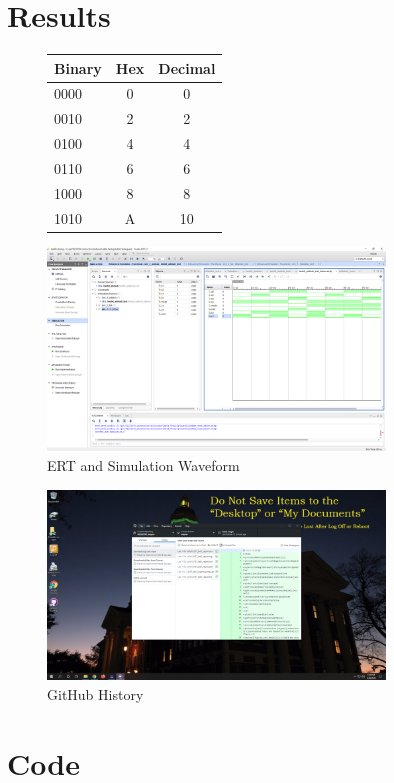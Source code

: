 \documentclass[11pt]{article}
\newcommand{\Verilog}[2][]{%
	
}
\begin{document}
\section*{Results}
\clearpage
\begin{figure}\centering
	\begin{tabular}{l|c|c}
		Binary & Hex & Decimal \\
		\midrule
		0000 & 0 & 0 \\
		0010 & 2 & 2 \\
		0100 & 4 & 4 \\
		0110 & 6 & 6 \\
		1000 & 8 & 8 \\
		1010 & A & 10 \\
		\bottomrule
	\end{tabular} 
	
	\includegraphics[width=0.8\textwidth,trim=18.7cm 15.3cm 0cm 4.4cm,clip]{lab1_example_screenshot}
	\caption{ERT and Simulation Waveform}
	\label{fig:sim_with_table_lab1}
\end{figure}

\begin{figure}[ht]\centering
	\includegraphics[width=0.8\textwidth,trim=16.9cm 8.06cm 16.9cm 9.45cm,clip]{Screenshot_GitHub}
	\caption{GitHub History}
	\label{fig:GitHub_Screenshot}			
\end{figure}
\clearpage

\section*{Code}

\Verilog[caption=Lab 1 Code,label=code:lab 1]{lab1_example_code.sv}
\end{document}
